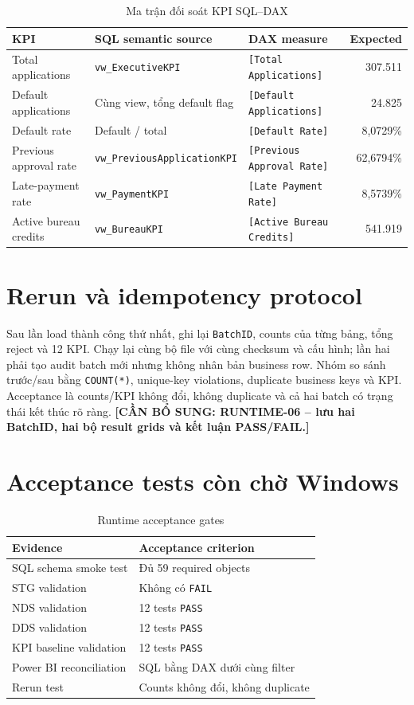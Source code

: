\documentclass[12pt,a4paper,oneside]{report}
\newcommand{\pending}[1]{\textcolor{warning}{\textbf{[CẦN BỔ SUNG: #1]}}}
\begin{document}
\begin{table}[H]
\centering
\caption{Ma trận đối soát KPI SQL--DAX}\label{tab:sql-dax}
\begin{tabularx}{\textwidth}{X X X r}
\toprule
KPI & SQL semantic source & DAX measure & Expected \\
\midrule
Total applications & \texttt{vw\_ExecutiveKPI} & \texttt{[Total Applications]} & 307.511 \\
Default applications & Cùng view, tổng default flag & \texttt{[Default Applications]} & 24.825 \\
Default rate & Default / total & \texttt{[Default Rate]} & 8,0729\% \\
Previous approval rate & \texttt{vw\_PreviousApplicationKPI} & \texttt{[Previous Approval Rate]} & 62,6794\% \\
Late-payment rate & \texttt{vw\_PaymentKPI} & \texttt{[Late Payment Rate]} & 8,5739\% \\
Active bureau credits & \texttt{vw\_BureauKPI} & \texttt{[Active Bureau Credits]} & 541.919 \\
\bottomrule
\end{tabularx}
\end{table}

\section{Rerun và idempotency protocol}
Sau lần load thành công thứ nhất, ghi lại \texttt{BatchID}, counts của từng bảng, tổng reject và 12 KPI. Chạy lại cùng bộ file với cùng checksum và cấu hình; lần hai phải tạo audit batch mới nhưng không nhân bản business row. Nhóm so sánh trước/sau bằng \texttt{COUNT(*)}, unique-key violations, duplicate business keys và KPI. Acceptance là counts/KPI không đổi, không duplicate và cả hai batch có trạng thái kết thúc rõ ràng. \pending{RUNTIME-06 -- lưu hai BatchID, hai bộ result grids và kết luận PASS/FAIL.}

\section{Acceptance tests còn chờ Windows}
\begin{table}[H]
\centering
\caption{Runtime acceptance gates}\label{tab:runtime-tests}
\begin{tabularx}{\textwidth}{X X}
\toprule
Evidence & Acceptance criterion \\
\midrule
SQL schema smoke test & Đủ 59 required objects \\
STG validation & Không có \texttt{FAIL} \\
NDS validation & 12 tests \texttt{PASS} \\
DDS validation & 12 tests \texttt{PASS} \\
KPI baseline validation & 12 tests \texttt{PASS} \\
Power BI reconciliation & SQL bằng DAX dưới cùng filter \\
Rerun test & Counts không đổi, không duplicate \\
\bottomrule
\end{tabularx}
\end{table}
\end{document}
